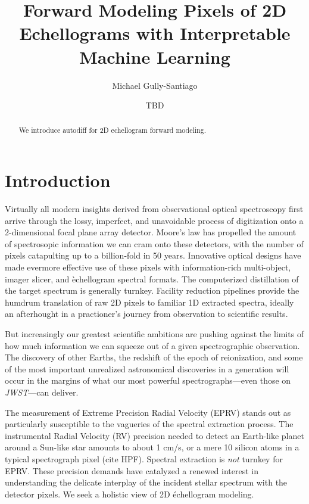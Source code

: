 \documentclass[twocolumn]{aastex63}
\begin{document}
\title{Forward Modeling Pixels of 2D Echellograms with Interpretable Machine Learning}

\author{Michael Gully-Santiago}

\author{TBD}


\begin{abstract}

  We introduce autodiff for 2D echellogram forward modeling.

\end{abstract}



\section{Introduction}\label{sec:intro}

Virtually all modern insights derived from observational optical spectroscopy first arrive through the lossy, imperfect, and unavoidable process of digitization onto a 2-dimensional focal plane array detector.  Moore's law has propelled the amount of spectrosopic information we can cram onto these detectors, with the number of pixels catapulting up to a billion-fold in 50 years.  Innovative optical designs have made evermore effective use of these pixels with information-rich multi-object, imager slicer, and \`echellogram spectral formats.  The computerized distillation of the target spectrum is generally turnkey.  Facility reduction pipelines provide the humdrum translation of raw 2D pixels to familiar 1D extracted spectra, ideally an afterhought in a practioner's journey from observation to scientific results.

But increasingly our greatest scientific ambitions are pushing against the limits of how much information we can squeeze out of a given spectrographic observation.  The discovery of other Earths, the redshift of the epoch of reionization, and some of the most important unrealized astronomical discoveries in a generation will occur in the margins of what our most powerful spectrographs---even those on \emph{JWST}---can deliver.

The measurement of Extreme Precision Radial Velocity (EPRV) stands out as particularly susceptible to the vagueries of the spectral extraction process.  The instrumental Radial Velocity (RV) precision needed to detect an Earth-like planet around a Sun-like star amounts to about 1 cm/s, or a mere 10 silicon atoms in a typical spectrograph pixel (cite HPF).  Spectral extraction is \emph{not} turnkey for EPRV.  These precision demands have catalyzed a renewed interest in understanding the delicate interplay of the incident stellar spectrum with the detector pixels.  We seek a holistic view of 2D \'echellogram modeling.
\end{document}
